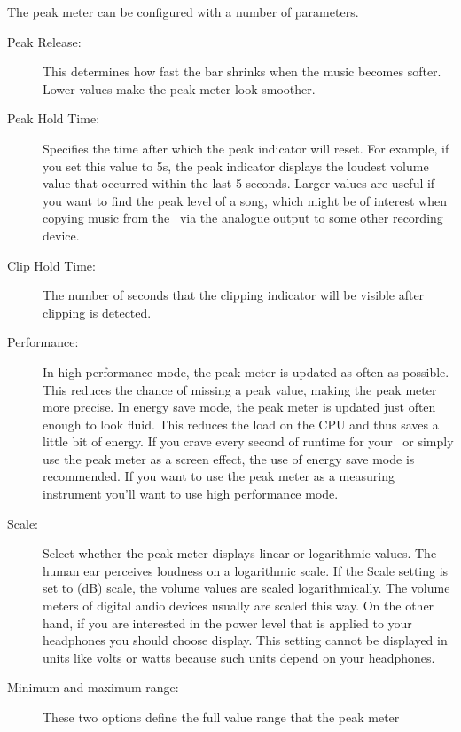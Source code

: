\begin{description}
{      The peak meter can be configured with a number of parameters. 
      \begin{description}
      \item[Peak Release:]
        This determines how fast the bar shrinks when the music becomes
        softer. Lower values make the peak meter look smoother.
      \item[Peak Hold Time:]
        Specifies the time after which the peak indicator will reset.
        For example, if you set this value to 5s, the peak indicator displays
        the loudest volume value that occurred within the last 5 seconds.
        Larger values are useful if you want to find the peak level of a song,
        which might be of interest when copying music from the \dap\ via the
        analogue output to some other recording device.
      \item[Clip Hold Time:]
        The number of seconds that the clipping indicator will be visible
        after clipping is detected.
      \item[Performance:]
        In high performance mode, the peak meter is updated as often as
        possible. This reduces the chance of missing a peak value, making
        the peak meter more precise. In energy save mode, the peak meter is
        updated just often enough to look fluid.  This reduces the load on
        the CPU and thus saves a little bit of energy.  If you crave every
        second of runtime for your \dap\ or simply use the peak meter as a
        screen effect, the use of energy save mode is recommended.  If you
        want to use the peak meter as a measuring instrument you'll want to
        use high performance mode.
      \item[Scale:]
        Select whether the peak meter displays linear or logarithmic values.
        The human ear perceives loudness on a logarithmic scale. If the Scale
        setting is set to  (dB) scale, the volume values
        are scaled logarithmically. The volume meters of digital audio
        devices usually are scaled this way. On the other hand, if you
        are interested in the power level that is applied to your headphones
        you should choose  display. This setting cannot be
        displayed in units like volts or watts because such units depend
        on your headphones.
      \item[Minimum and maximum range:]
        These two options define the full value range that the peak meter

\end{description}}
\end{description}
